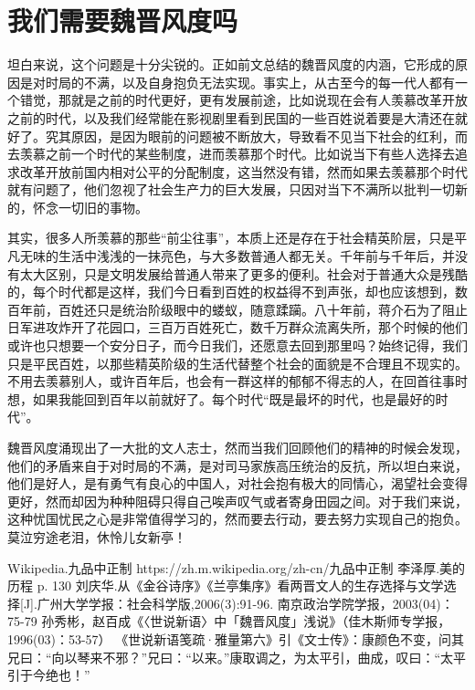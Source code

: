 \documentclass[12pt,a4paper]{ctexart}
\begin{document}
\section{我们需要魏晋风度吗}
坦白来说，这个问题是十分尖锐的。正如前文总结的魏晋风度的内涵，它形成的原因是对时局的不满，以及自身抱负无法实现。事实上，从古至今的每一代人都有一个错觉，那就是之前的时代更好，更有发展前途，比如说现在会有人羡慕改革开放之前的时代，以及我们经常能在影视剧里看到民国的一些百姓说着要是大清还在就好了。究其原因，是因为眼前的问题被不断放大，导致看不见当下社会的红利，而去羡慕之前一个时代的某些制度，进而羡慕那个时代。比如说当下有些人选择去追求改革开放前国内相对公平的分配制度，这当然没有错，然而如果去羡慕那个时代就有问题了，他们忽视了社会生产力的巨大发展，只因对当下不满所以批判一切新的，怀念一切旧的事物。

其实，很多人所羡慕的那些“前尘往事”，本质上还是存在于社会精英阶层，只是平凡无味的生活中浅浅的一抹亮色，与大多数普通人都无关。千年前与千年后，并没有太大区别，只是文明发展给普通人带来了更多的便利。社会对于普通大众是残酷的，每个时代都是这样，我们今日看到百姓的权益得不到声张，却也应该想到，数百年前，百姓还只是统治阶级眼中的蝼蚁，随意蹂躏。八十年前，蒋介石为了阻止日军进攻炸开了花园口，三百万百姓死亡，数千万群众流离失所，那个时候的他们或许也只想要一个安分日子，而今日我们，还愿意去回到那里吗？始终记得，我们只是平民百姓，以那些精英阶级的生活代替整个社会的面貌是不合理且不现实的。不用去羡慕别人，或许百年后，也会有一群这样的郁郁不得志的人，在回首往事时想，如果我能回到百年以前就好了。每个时代“既是最坏的时代，也是最好的时代”。

魏晋风度涌现出了一大批的文人志士，然而当我们回顾他们的精神的时候会发现，他们的矛盾来自于对时局的不满，是对司马家族高压统治的反抗，所以坦白来说，他们是好人，是有勇气有良心的中国人，对社会抱有极大的同情心，渴望社会变得更好，然而却因为种种阻碍只得自己唉声叹气或者寄身田园之间。对于我们来说，这种忧国忧民之心是非常值得学习的，然而要去行动，要去努力实现自己的抱负。莫泣穷途老泪，休怜儿女新亭！
\small

\begin{thebibliography}{99}
    \setlength{\parskip}{0pt}

     Wikipedia.九品中正制 https://zh.m.wikipedia.org/zh-cn/九品中正制
     李泽厚.美的历程 p. 130
     刘庆华.从《金谷诗序》《兰亭集序》看两晋文人的生存选择与文学选择[J].广州大学学报：社会科学版,2006(3):91-96.
     南京政治学院学报，2003(04)：75-79
     孙秀彬，赵百成《〈世说新语〉中「魏晋风度」浅说》（佳木斯师专学报，1996(03)：53-57）
     《世说新语笺疏·雅量第六》引《文士传》：康颜色不变，问其兄曰：“向以琴来不邪？”兄曰：“以来。”康取调之，为太平引，曲成，叹曰：“太平引于今绝也！”
\end{thebibliography}
\end{document}
